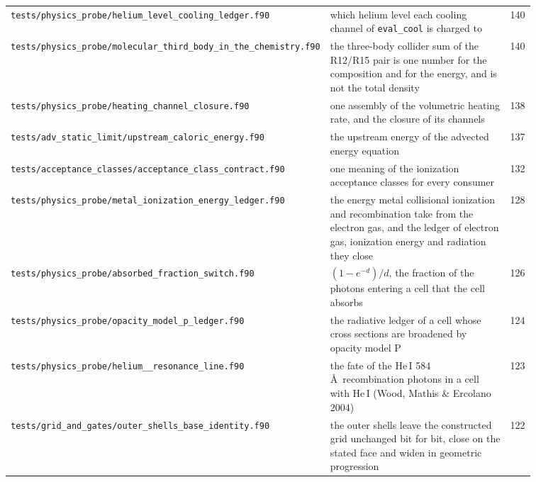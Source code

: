 {\begin{longtable}{@{}>{\raggedright\arraybackslash}p{0.36\linewidth} >{\raggedright\arraybackslash}p{0.50\linewidth} r@{}}
\texttt{tests/\allowbreak physics\_\allowbreak probe/\allowbreak helium\_\allowbreak level\_\allowbreak cooling\_\allowbreak ledger.f90} & which helium level each cooling channel of \texttt{eval\_cool} is charged to & 140 \\
\texttt{tests/\allowbreak physics\_\allowbreak probe/\allowbreak molecular\_\allowbreak third\_\allowbreak body\_\allowbreak in\_\allowbreak the\_\allowbreak chemistry.f90} & the three-body collider sum of the R12/R15 pair is one number for the composition and for the energy, and is not the total density & 140 \\
\texttt{tests/\allowbreak physics\_\allowbreak probe/\allowbreak heating\_\allowbreak channel\_\allowbreak closure.f90} & one assembly of the volumetric heating rate, and the closure of its channels & 138 \\
\texttt{tests/\allowbreak adv\_\allowbreak static\_\allowbreak limit/\allowbreak upstream\_\allowbreak caloric\_\allowbreak energy.f90} & the upstream energy of the advected energy equation & 137 \\
\texttt{tests/\allowbreak acceptance\_\allowbreak classes/\allowbreak acceptance\_\allowbreak class\_\allowbreak contract.f90} & one meaning of the ionization acceptance classes for every consumer & 132 \\
\texttt{tests/\allowbreak physics\_\allowbreak probe/\allowbreak metal\_\allowbreak ionization\_\allowbreak energy\_\allowbreak ledger.f90} & the energy metal collisional ionization and recombination take from the electron gas, and the ledger of electron gas, ionization energy and radiation they close & 128 \\
\texttt{tests/\allowbreak physics\_\allowbreak probe/\allowbreak absorbed\_\allowbreak fraction\_\allowbreak switch.f90} & $(1-e^{-d})/d$, the fraction of the photons entering a cell that the cell absorbs & 126 \\
\texttt{tests/\allowbreak physics\_\allowbreak probe/\allowbreak opacity\_\allowbreak model\_\allowbreak p\_\allowbreak ledger.f90} & the radiative ledger of a cell whose cross sections are broadened by opacity model P & 124 \\
\texttt{tests/\allowbreak physics\_\allowbreak probe/\allowbreak helium\_\allowbreak 584\_\allowbreak resonance\_\allowbreak line.f90} & the fate of the He\,I 584\,\AA\ recombination photons in a cell with He\,I (Wood, Mathis \& Ercolano 2004) & 123 \\
\texttt{tests/\allowbreak grid\_\allowbreak and\_\allowbreak gates/\allowbreak outer\_\allowbreak shells\_\allowbreak base\_\allowbreak identity.f90} & the outer shells leave the constructed grid unchanged bit for bit, close on the stated face and widen in geometric progression & 122 \\

\end{longtable}}
